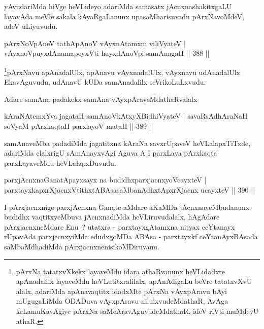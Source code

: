 \begin{artha}
yAvudariMda hiVge heVLideyo adariMda samasatx jAcnxnashakitxgaLU layavAda meVle sakala kAyaRgaLanunx upasaMharisuvadu pArxNavoMdeV, adeV uLiyuvudu.
\end{artha}


\begin{shl}
pArxNoV\s pAneV tathA\s pAnoV vAyxnAtamxni viliVyateV |
vAyxnoV\s puyxdAnamapeyxVti huyxdAnoV\s pi samAnagaH \hfill || 388 ||
\end{shl}

\begin{artha}
\footnote{pArxNa tatatxvXkekx layaveMdu idara athaRvanunx heVLidadxre apAnadalilx layaveMdu heVLutitxralilalx, apAnAdigaLu beVre tatatxvXvU alalx, adariMda apAnavaqtitx idadxMte pArxNa vAyxpAravu bAyi mUgugaLiMda ODADuva vAyxpAravu nilulxvudeMdathaR, AvAga keLamuKavAgiye pArxNa saMcAravAguvudeMdathaR. ideV riVti muMdeyU athaR.}pArxNavu apAnadalUlx, apAnavu vAyxnadalUlx, vAyxnavu udAnadalUlx EkavAguvudu, udAnavU kUDa samAnadalilx seVrikoLuLxvudu.
\end{artha}

\begin{artha}
Adare samAna padakekx samAna vAyxpAraveMdathaRvalalx
\end{artha}

\begin{shl}
kAraNAtemxYva jagataH samAnoVkAtxyX\s BidhiVyateV |
savaRsAdhAraNaH soV\s yaM pArxkaqtaH parxlayoV mataH \hfill || 389 ||
\end{shl}

\begin{artha}
samAnaveMba padadiMda jagatitxna kAraNa savxrUpaveV heVLalapxTiTxde, adariMda elalxrigU sAmAnayxvAgi Aguva A I parxLaya pArxkaqta parxLayaveMdu heVLalapxDuvudu.
\end{artha}


\begin{shl}
parxjAcnxnaGanatA\s payxsayx na budidhxparxjacnxyoVcayxteV |
parxtayxkapxrXjocnxVtithxtABAsasaMbanAdhxtApxrXjacnx ucayxteV \hfill || 390 ||
\end{shl}

\begin{artha}
I pArxjacnxnige parxjAcnxna Ganate aMdare aKaMDa jAcnxnaveMbudanunx budidhx vaqtitxyeMbuva jAcnxnadiMda heVLiruvudalalx, hAgAdare pArxjacnxneMdare Enu~? utatxra - parxtayxgAtamxna nityax ceYtanayx rUpavAda parxjecnxyiMda edudxgoMDa ABAsa - parxtayxkf ceYtanAyxBAsada saMbaMdhadiMda pArxjacnxnenisikoMDiruvanu.
\end{artha}

